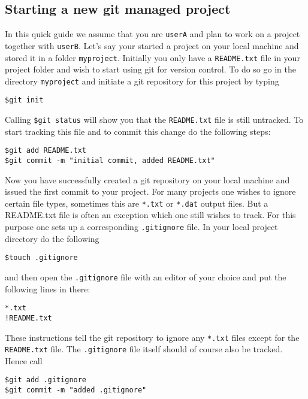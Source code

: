 \documentclass{article}
\begin{document}
\subsection{Starting a new git managed project}
In this quick guide we assume that you are \verb|userA|
and plan to work on a project together with \verb|userB|. Let's say your started a project on your local machine and stored it in a folder \verb|myproject|. Initially you only have a \verb|README.txt| file in your project folder and wish to start using git for version control.
To do so go in the directory \verb|myproject| and initiate a git repository for this project by typing
\begin{lstlisting}
$git init
\end{lstlisting}
Calling \verb|$git status| will show you that the \verb|README.txt| file is still untracked.
To start tracking this file and to commit this change do the following steps:
\begin{lstlisting}
$git add README.txt
$git commit -m "initial commit, added README.txt"
\end{lstlisting}
Now you have successfully created a git repository on your local machine and issued the first commit to your project. For many projects one wishes to ignore certain file types, sometimes this are \verb|*.txt| or \verb|*.dat| output files. But a README.txt file is often an exception which one still wishes to track. For this purpose one sets up a corresponding \verb|.gitignore| file.
In your local project directory do the following
\begin{lstlisting}
$touch .gitignore
\end{lstlisting}
and then open the \verb|.gitignore| file with an editor of your choice and put the following lines in there:
\begin{lstlisting}
*.txt
!README.txt
\end{lstlisting}
These instructions tell the git repository to ignore any \verb|*.txt| files except for the \verb|README.txt| file. The \verb|.gitignore| file itself should of course also be tracked.
Hence call
\begin{lstlisting}
$git add .gitignore
$git commit -m "added .gitignore"
\end{lstlisting}
\end{document}
